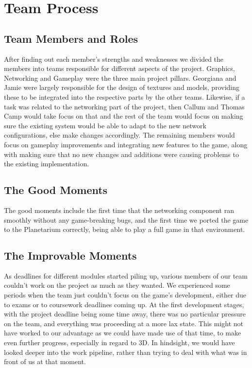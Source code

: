 \documentclass[11pt,a4paper]{article}
\begin{document}
        \section{Team Process}
        
        \subsection{Team Members and Roles}

After finding out each member's strengths and weaknesses we divided the members into teams responsible for different aspects of the project. Graphics, Networking and Gameplay were the three main project pillars. Georgiana and Jamie were largely responsible for the design of textures and models, providing these to be integrated into the respective parts by the other teams. Likewise, if a task was related to the networking part of the project, then Callum and Thomas Camp would take focus on that and the rest of the team would focus on making sure the existing system would be able to adapt to the new network configurations, else make changes accordingly. The remaining members would focus on gameplay improvements and integrating new features to the game, along with making sure that no new changes and additions were causing problems to the existing implementation.
         
         
 \subsection{The Good Moments}
        The good moments include the first time that the networking component ran smoothly without any game-breaking bugs, and the first time we ported the game to the Planetarium correctly, being able to play a full game in that environment.

        \subsection{The Improvable Moments}
        As deadlines for different modules started piling up, various members of our team couldn't work on the project as much as they wanted. We experienced some periods when the team just couldn't focus on the game's development, either due to exams or to coursework deadlines coming up.
        At the first development stages, with the project deadline being some time away, there was no particular pressure on the team, and everything was proceeding at a more lax state. This might not have worked to our advantage as we could have made use of that time, to make even further progress, especially in regard to 3D. In hindsight, we would have looked deeper into the work pipeline, rather than trying to deal with what was in front of us at that moment.  
\end{document}
